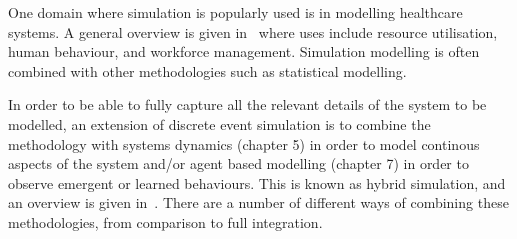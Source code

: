One domain where simulation is popularly used is in modelling healthcare systems.
A general overview is given in~\parencite{brailsford2009analysis} where uses
include resource utilisation, human behaviour, and workforce management. Simulation
modelling is often combined with other methodologies such as statistical modelling.

In order to be able to fully capture all the relevant details of the system to be
modelled, an extension of discrete event simulation is to combine the methodology
with systems dynamics (chapter 5) in order to model continous aspects of the system %
and/or agent based modelling (chapter 7) in order to observe emergent or learned
behaviours. This is known as hybrid simulation, and an overview is given
in~\parencite{brailsford2019hybrid}. There are a number of different ways of
combining these methodologies, from comparison to full integration.
